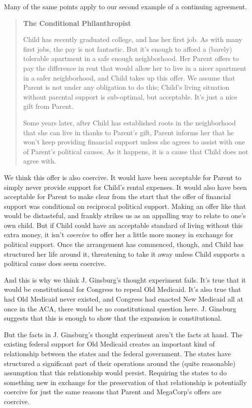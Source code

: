\documentclass[
  11pt,
  letterpaper,
  DIV=11,
  numbers=noendperiod,
  twoside]{scrartcl}
\begin{document}
Many of the same points apply to our second example of a continuing
agreement.

\begin{quote}
\textbf{The Conditional Philanthropist}

Child has recently graduated college, and has her first job. As with
many first jobs, the pay is not fantastic. But it's enough to afford a
(barely) tolerable apartment in a safe enough neighborhood. Her Parent
offers to pay the difference in rent that would allow her to live in a
nicer apartment in a safer neighborhood, and Child takes up this offer.
We assume that Parent is not under any obligation to do this; Child's
living situation without parental support is sub-optimal, but
acceptable. It's just a nice gift from Parent.

Some years later, after Child has established roots in the neighborhood
that she can live in thanks to Parent's gift, Parent informs her that he
won't keep providing financial support unless she agrees to assist with
one of Parent's political causes. As it happens, it is a cause that
Child does not agree with.
\end{quote}

We think this offer is also coercive. It would have been acceptable for
Parent to simply never provide support for Child's rental expenses. It
would also have been acceptable for Parent to make clear from the start
that the offer of financial support was conditional on reciprocal
political support. Making an offer like that would be distasteful, and
frankly strikes us as an appalling way to relate to one's own child. But
if Child could have an acceptable standard of living without this extra
money, it isn't \emph{coercive} to offer her a little more money in
exchange for political support. Once the arrangement has commenced,
though, and Child has structured her life around it, threatening to take
it away unless Child supports a political cause does seem coercive.

And this is why we think J. Ginsburg's thought experiment fails. It's
true that it would be constitutional for Congress to repeal Old
Medicaid. It's also true that had Old Medicaid never existed, and
Congress had enacted New Medicaid all at once in the ACA, there would be
no constitutional question here. J. Ginsburg suggests that this is
enough to show that the expansion is constitutional.

But the facts in J. Ginsburg's thought experiment aren't the facts at
hand. The existing federal support for Old Medicaid creates an important
kind of relationship between the states and the federal government. The
states have structured a significant part of their operations around the
(quite reasonable) assumption that this relationship would persist.
Requiring the states to do something new in exchange for the
preservation of that relationship is potentially coercive for just the
same reasons that Parent and MegaCorp's offers are coercive.
\end{document}
